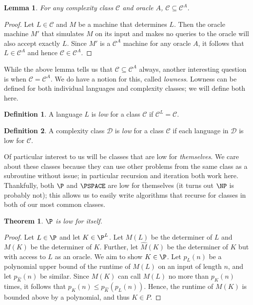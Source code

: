 \documentclass[english,12pt]{reedthesis}
\theoremstyle{plain}
\newtheorem{thm}{Theorem}[section]
\newtheorem{lemma}[lemma]{Lemma}
\theoremstyle{definition}
\newtheorem{defn}[defn]{Definition}
\theoremstyle{remark}
\begin{document}
\begin{lemma}\label{thm:relativizing-increases}
  For any complexity class $\mathcal{C}$ and oracle $A$, $\mathcal{C} \subseteq \mathcal{C}^{A}$.
\end{lemma}

\begin{proof}
  Let $L \in \mathcal{C}$ and $M$ be a machine that determines $L$. Then the oracle machine
  $M'$ that simulates $M$ on its input and makes no queries to the oracle will
  also accept exactly $L$. Since $M'$ is a $\mathcal{C}^{A}$ machine for any oracle $A$,
  it follows that $L \in \mathcal{C}^{A}$ and hence $\mathcal{C} \in \mathcal{C}^{A}$.
\end{proof}

While the above lemma tells us that $\mathcal{C} \subseteq \mathcal{C}^{A}$ always, another interesting
question is when $\mathcal{C} = \mathcal{C}^{A}$. We do have a notion for this, called
\emph{lowness}. Lowness can be defined for both individual languages and
complexity classes; we will define both here.

\begin{defn}\label{def:low-class}
  A language $L$ is \emph{low} for a class $\mathcal{C}$ if $\mathcal{C}^{L} = \mathcal{C}$.
\end{defn}

\begin{defn}\label{def:low-lang}
  A complexity class $\mathcal{D}$ is \emph{low} for a class $\mathcal{C}$ if each language in $\mathcal{D}$
  is low for $\mathcal{C}$.
\end{defn}

Of particular interest to us will be classes that are low for \emph{themselves}.
We care about these classes because they can use other problems from the same
class as a subroutine without issue; in particular recursion and iteration both
work here. Thankfully, both $\P$ and $\PSPACE$ are low for themselves (it turns
out $\NP$ is probably not); this allows us to easily write algorithms that
recurse for classes in both of our most common classes.

\begin{thm}\label{thm:p-low}
  $\P$ is low for itself.
\end{thm}

\begin{proof}
  Let $L \in \P$ and let $K \in \P^{L}$. Let $M(L)$ be the determiner of $L$ and
  $M(K)$ be the determiner of $K$. Further, let $\hat{M}(K)$ be the determiner
  of $K$ but with access to $L$ as an oracle. We aim to show $K \in \P$. Let
  $p_{L}(n)$ be a polynomial upper bound of the runtime of $M(L)$ on an input of
  length $n$, and let $p_{\hat{K}}(n)$ be similar. Since $M(K)$ can call $M(L)$ no
  more than $p_{\hat{K}}(n)$ times, it follows that
  $p_{K}(n) \le p_{\hat{K}}(p_{L}(n))$. Hence, the runtime of $M(K)$ is bounded
  above by a polynomial, and thus $K \in P$.
\end{proof}
\end{document}
